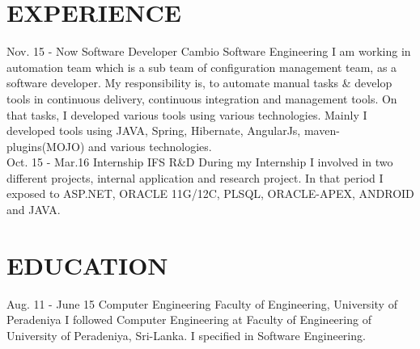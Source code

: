 \documentclass[]{cv-class}
\begin{document}
\section{EXPERIENCE}
\begin{entrylist}
  \entry
    {Nov. 15 - Now}
    {Software Developer}
    {Cambio Software Engineering}
    {I am working in automation team which is a sub team of configuration management team, as a software developer. My responsibility is, to automate manual tasks \& develop tools in continuous delivery, continuous integration and management tools. On that tasks, I developed various tools using various technologies. Mainly I developed tools using JAVA, Spring, Hibernate, AngularJs, maven-plugins(MOJO) and various technologies.}
\\
  \entry
    {Oct. 15 - Mar.16}
    {Internship}
    {IFS R\&D}
    {During my Internship I involved in two different projects, internal application and research project. In that period I exposed to ASP.NET, ORACLE 11G/12C, PLSQL, ORACLE-APEX, ANDROID and JAVA.}
\end{entrylist}

\section{EDUCATION}
\begin{entrylist}
  \entry
    {Aug. 11 - June 15}
    {Computer Engineering}
    {Faculty of Engineering, University of Peradeniya}
    {I followed Computer Engineering at Faculty of Engineering of University of Peradeniya, Sri-Lanka. I specified in Software Engineering.}
\end{entrylist}
\end{document}
